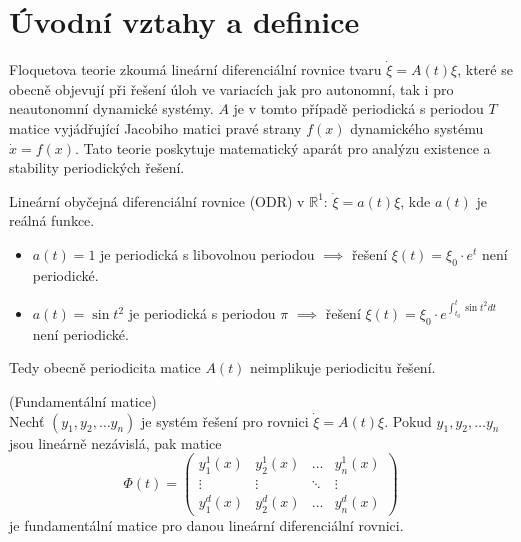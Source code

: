 \section{Úvodní vztahy a definice}\label{sec:uvod}

Floquetova teorie zkoumá lineární diferenciální rovnice tvaru  $\dot{\xi } = A(t) \xi$, které se obecně objevují při řešení úloh ve variacích jak pro autonomní, tak i pro neautonomní dynamické systémy. $A$ je v tomto případě periodická s periodou $T$ matice vyjádřující Jacobiho matici pravé strany $f(x)$ dynamického systému $\dot{x} = f(x)$.  Tato teorie poskytuje matematický aparát pro analýzu existence a stability periodických řešení.

\medskip

\begin{exmp}
	Lineární obyčejná diferenciální rovnice (ODR) v $\mathbb{R}^{1}$: $\dot{\xi} = a(t)  \xi$, kde $a(t)$ je reálná funkce.
	
	\begin{itemize}
		\item $a(t) = 1$ je periodická s libovolnou periodou $\implies$ řešení $\xi(t) = \xi_{0} \cdot e^{t}$ není  periodické.
		\item $a(t) = \sin t^{2}$ je periodická s periodou $\pi$ $\implies$ řešení $\xi(t) = \xi_{0} \cdot e^{ \int_{t_{0}}^{t} \sin t^{2} dt }$ není periodické.
	\end{itemize}

	Tedy obecně periodicita matice $A(t)$ neimplikuje periodicitu řešení.
\end{exmp}

\medskip

\begin{defn} (Fundamentální matice) \\
	Nechť $(y_{1}, y_{2}, \dots y_{n})$ je systém řešení pro rovnici $\dot{\xi } = A(t) \xi$. Pokud $y_{1}, y_{2}, \dots y_{n}$ jsou lineárně nezávislá, pak matice 
	\begin{equation}
		\Phi(t) = 
		\begin{pmatrix} 
			y_{1}^{1}(x) & y_{2}^{1}(x) & \dots  & y_{n}^{1}(x) \\ 
			\vdots &  \vdots & \ddots & \vdots \\ 
			y_{1}^{d}(x) & y_{2}^{d}(x) & \dots & y_{n}^{d}(x) 
		\end{pmatrix} 
	\end{equation}
	je fundamentální matice pro danou lineární diferenciální rovnici.
\end{defn}

